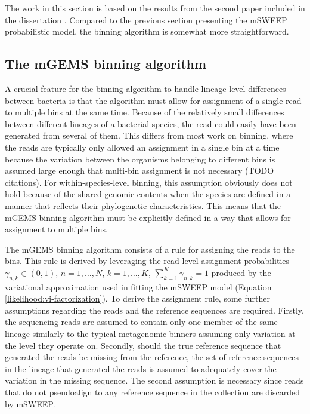 \documentclass[officiallayout]{tktla}
\begin{document}
The work in this section is based on the results from the second paper
included in the dissertation \citep{maklin_bacterial_2021}. Compared
to the previous section presenting the mSWEEP probabilistic model, the
binning algorithm is somewhat more straightforward.

\subsection{The mGEMS binning algorithm}

A crucial feature for the binning algorithm to handle lineage-level
differences between bacteria is that the algorithm must allow for
assignment of a single read to multiple bins at the same time. Because
of the relatively small differences between different lineages of a
bacterial species, the read could easily have been generated from
several of them. This differs from most work on binning, where the
reads are typically only allowed an assignment in a single bin at a
time because the variation between the organisms belonging to
different bins is assumed large enough that multi-bin assignment is
not necessary (TODO citations). For within-species-level binning, this
assumption obviously does not hold because of the shared genomic
contents when the species are defined in a manner that reflects their
phylogenetic characteristics. This means that the mGEMS binning
algorithm must be explicitly defined in a way that allows for
assignment to multiple bins.

The mGEMS binning algorithm consists of a rule for assigning the reads
to the bins. This rule is derived by leveraging the read-level
assignment probabilities $\gamma_{n, k} \in \left(0, 1\right)$, $n =
1, \dots, N$, $k = 1, \dots, K$, $\sum_{k = 1}^{K}\gamma_{n, k} = 1$
produced by the variational approximation used in fitting the mSWEEP
model (Equation \eqref{likelihood:vi-factorization}). To derive the
assignment rule, some further assumptions regarding the reads and the
reference sequences are required. Firstly, the sequencing reads are
assumed to contain only one member of the same lineage \textemdash{ }
similarly to the typical metagenomic binners assuming only variation
at the level they operate on. Secondly, should the true reference
sequence that generated the reads be missing from the reference, the
set of reference sequences in the lineage that generated the reads is
assumed to adequately cover the variation in the missing sequence. The
second assumption is necessary since reads that do not pseudoalign to
any reference sequence in the collection are discarded by mSWEEP.
\end{document}
